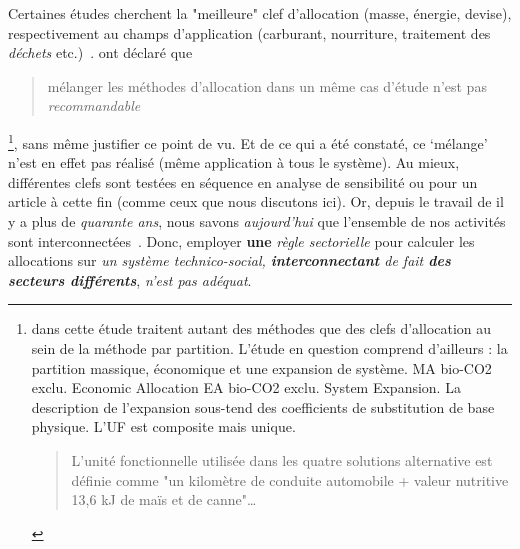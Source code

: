 Certaines études cherchent la "meilleure" clef d'allocation (masse, énergie, devise), respectivement au champs d'application (carburant, nourriture, traitement des \emph{déchets} etc.)~\cite{silva_wood-based_2014, ayer_co-product_2006, cherubini_influence_2011}.
\citeauthor{luo_allocation_2009} ont déclaré que \blockcquote{luo_allocation_2009}{mélanger les méthodes d'allocation dans un même cas d'étude n'est pas \emph{recommandable}}\footnote{
\citeauthor{luo_allocation_2009} dans cette étude traitent autant des méthodes que des clefs d'allocation au sein de la méthode par partition.
L'étude en question comprend d'ailleurs : la partition massique, économique et une expansion de système.
MA bio-CO2 exclu.
Economic Allocation
EA bio-CO2 exclu.
System Expansion.
La description de l'expansion sous-tend des coefficients de substitution de base physique.
L'\gls{UF} est composite mais unique.
\blockcquote{luo_allocation_2009}{
L'unité fonctionnelle utilisée dans les quatre solutions alternative est définie comme "un kilomètre de conduite automobile + valeur nutritive 13,6 kJ de maïs et de canne"\ldots
}
}, sans même justifier ce point de vu.
Et de ce qui a été constaté, ce `mélange' n'est en effet pas réalisé (même application à tous le système).
Au mieux, différentes clefs sont testées en séquence en analyse de sensibilité ou pour un article à cette fin (comme ceux que nous discutons ici). %
Or, depuis le travail de \citeauthor{leontief_environmental_1970} il y a plus de \emph{quarante ans}, nous savons \emph{aujourd'hui} que l'ensemble de nos activités sont interconnectées~\cite{leontief_environmental_1970}. Donc, employer \textbf{une} \emph{règle sectorielle} pour calculer les allocations sur \emph{un système technico-social, \textbf{interconnectant} de fait \textbf{des secteurs différents}}, \emph{n'est pas adéquat}.


